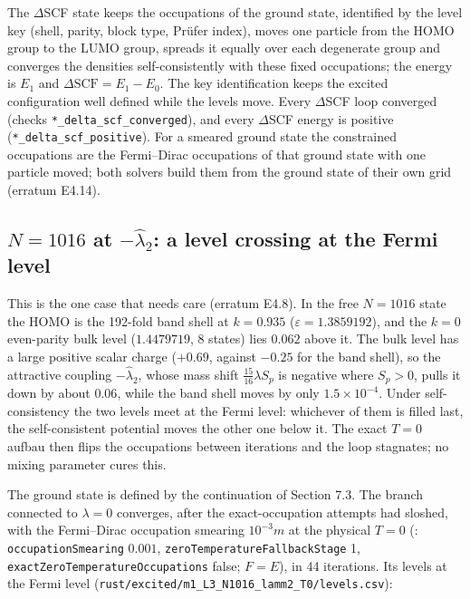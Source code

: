 \documentclass[11pt]{article}
\begin{document}
The $\Delta$SCF state keeps the occupations of the ground state, identified by the level key (shell, parity, block type, Prüfer index), moves one particle from the HOMO group to the LUMO group, spreads it equally over each degenerate group and converges the densities self-consistently with these fixed occupations; the energy is $E_1$ and $\Delta\mathrm{SCF}=E_1-E_0$. The key identification keeps the excited configuration well defined while the levels move. Every $\Delta$SCF loop converged (checks \texttt{*\_delta\_\allowbreak{}scf\_conv\allowbreak{}erged}), and every $\Delta$SCF energy is positive (\texttt{*\_delta\_\allowbreak{}scf\_posi\allowbreak{}tive}). For a smeared ground state the constrained occupations are the Fermi--Dirac occupations of that ground state with one particle moved; both solvers build them from the ground state of their own grid (erratum E4.14).

\subsection{\texorpdfstring{$N=1016$}{N=1016} at \texorpdfstring{$-\hat\lambda_2$}{-λ\_2}: a level crossing at the Fermi level}

This is the one case that needs care (erratum E4.8). In the free $N=1016$ state the HOMO is the 192-fold band shell at $k=0.935$ ($\varepsilon=1.3859192$), and the $k=0$ even-parity bulk level ($1.4479719$, 8 states) lies $0.062$ above it. The bulk level has a large positive scalar charge ($+0.69$, against $-0.25$ for the band shell), so the attractive coupling $-\hat\lambda_2$, whose mass shift $\tfrac{15}{16}\lambda S_p$ is negative where $S_p>0$, pulls it down by about $0.06$, while the band shell moves by only $1.5\times10^{-4}$. Under self-consistency the two levels meet at the Fermi level: whichever of them is filled last, the self-consistent potential moves the other one below it. The exact $T=0$ aufbau then flips the occupations between iterations and the loop stagnates; no mixing parameter cures this.

The ground state is defined by the continuation of Section 7.3. The branch connected to $\lambda=0$ converges, after the exact-occupation attempts had sloshed, with the Fermi--Dirac occupation smearing $10^{-3}m$ at the physical $T=0$ (\texttt{}: \texttt{occupati\allowbreak{}onSmeari\allowbreak{}ng} $0.001$, \texttt{zeroTemp\allowbreak{}eratureF\allowbreak{}allbackS\allowbreak{}tage} 1, \texttt{exactZer\allowbreak{}oTempera\allowbreak{}tureOccu\allowbreak{}pations} false; $F=E$), in 44 iterations. Its levels at the Fermi level (\texttt{rust/exc\allowbreak{}ited/m1\_\allowbreak{}L3\_N1016\allowbreak{}\_lamm2\_T\allowbreak{}0/levels\allowbreak{}.csv}):
\end{document}

